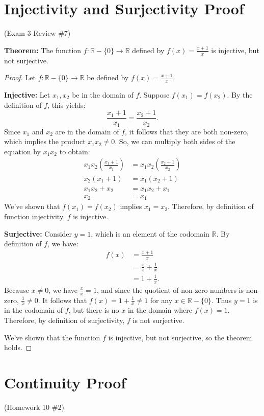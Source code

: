 \documentclass[12pt]{amsart}
\begin{document}
\section{Injectivity and Surjectivity Proof}
\begin{center}(Exam 3 Review $\#7$)\end{center}
\textbf{Theorem:} The function $f: \mathbb{R}-\{0\} \rightarrow \mathbb{R}$ defined by $f(x) = \frac{x+1}{x}$ is injective, but not surjective.
\begin{proof}
Let $f: \mathbb{R} - \{0\} \rightarrow \mathbb{R}$ be defined by $f(x)=\frac{x+1}{x}$.

\medskip
\textbf{Injective:} 
Let $x_1,x_2$ be in the domain of $f$. Suppose $f(x_1) = f(x_2)$. By the definition of $f$, this yields:
\[
    \frac{x_1+1}{x_1} = \frac{x_2+1}{x_2}.
\]
Since $x_1$ and $x_2$ are in the domain of $f$, it follows that they are both non-zero, which implies the product $x_1x_2 \ne 0$. So, we can multiply both sides of the equation by $x_1x_2$ to obtain:
\begin{align*}
    x_{1}x_{2}\left(\frac{x_1+1}{x_1}\right) &= x_{1}x_{2}\left(\frac{x_2+1}{x_2}\right) \\
    x_2(x_1+1) &= x_1(x_2+1)\\
    x_1x_2+x_2 &= x_1x_2+x_1 \\
    x_2 &= x_1
\end{align*}
We've shown that $f(x_1)=f(x_2)$ implies $x_1=x_2$. Therefore, by definition of function injectivity, $f$ is injective.

\medskip
\textbf{Surjective:} 
Consider $y = 1$, which is an element of the codomain $\mathbb{R}$. By definition of $f$, we have:
\begin{align*}
    f(x) &= \frac{x+1}{x}\\
         &= \frac{x}{x}+\frac{1}{x}\\
         &= 1+\frac{1}{x}.
\end{align*}
Because $x \neq 0$, we have $\frac{x}{x} = 1$, and since the quotient of non-zero numbers is non-zero, $\frac{1}{x} \neq 0$. It follows that $f(x) = 1 + \frac{1}{x} \neq 1$ for any $x \in \mathbb{R}-\{0\}$. Thus $y = 1$ is in the codomain of $f$, but there is no $x$ in the domain where $f(x)=1$. Therefore, by definition of surjectivity, $f$ is not surjective. 

We've shown that the function $f$ is injective, but not surjective, so the theorem holds.
\end{proof}
\newpage
\section{Continuity Proof}
\begin{center}(Homework 10 $\#2$)\end{center}
\end{document}
